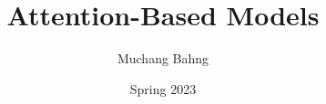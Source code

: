 \documentclass{article}
\begin{document}

\title{Attention-Based Models}
\author{Muchang Bahng}
\date{Spring 2023}

\maketitle
\tableofcontents
\pagebreak 









\end{document}
